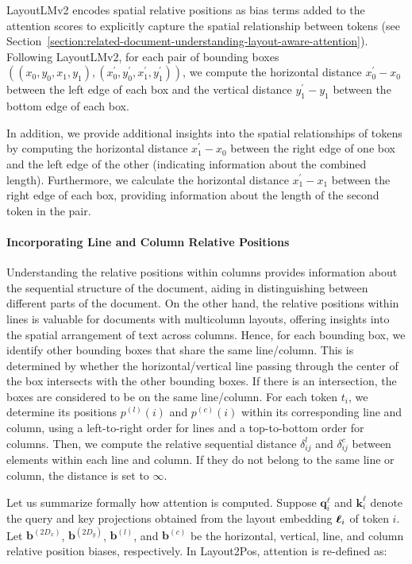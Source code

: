 LayoutLMv2 encodes spatial relative positions as bias terms added to the attention scores to explicitly capture the spatial relationship between tokens (see Section~\ref{section:related-document-understanding-layout-aware-attention}). Following LayoutLMv2, for each pair of bounding boxes $((x_0, y_0, x_1, y_1), (x^{\prime}_0, y^{\prime}_0, x^{\prime}_1, y^{\prime}_1))$, we compute the horizontal distance $x^{\prime}_0 - x_0$ between the left edge of each box and the vertical distance $y^{\prime}_1 - y_1$ between the bottom edge of each box. 

In addition, we provide additional insights into the spatial relationships of tokens by computing the horizontal distance $x^{\prime}_1 - x_0$ between the right edge of one box and the left edge of the other (indicating information about the combined length). Furthermore, we calculate the horizontal distance $x^{\prime}_1 - x_1$ between the right edge of each box, providing information about the length of the second token in the pair. 

\paragraph{Incorporating Line and Column Relative Positions}

Understanding the relative positions within columns provides information about the sequential structure of the document, aiding in distinguishing between different parts of the document. On the other hand, the relative positions within lines is valuable for documents with multicolumn layouts, offering insights into the spatial arrangement of text across columns. Hence, for each bounding box, we identify other bounding boxes that share the same line/column. This is determined by whether the horizontal/vertical line passing through the center of the box intersects with the other bounding boxes. If there is an intersection, the boxes are considered to be on the same line/column. For each token $t_i$, we determine its positions $p^{(l)}(i)$ and $p^{(c)}(i)$ within its corresponding line and column, using a left-to-right order for lines and a top-to-bottom order for columns. Then, we compute the relative sequential distance $\delta^{l}_{ij}$ and $\delta^{c}_{ij}$ between elements within each line and column. If they do not belong to the same line or column, the distance is set to $\infty$. 

Let us summarize formally how attention is computed. Suppose $\bm{q}^{\ell}_i$ and $\bm{k}^{\ell}_i$ denote the query and key projections obtained from the layout embedding $\boldsymbol{\ell}_i$ of token $i$. Let $\bm{b}^{(2D_x)}$, $\bm{b}^{(2D_y)}$, $\bm{b}^{(l)}$, and $\bm{b}^{(c)}$ be the horizontal, vertical, line, and column relative position biases, respectively. In Layout2Pos, attention is re-defined as:

